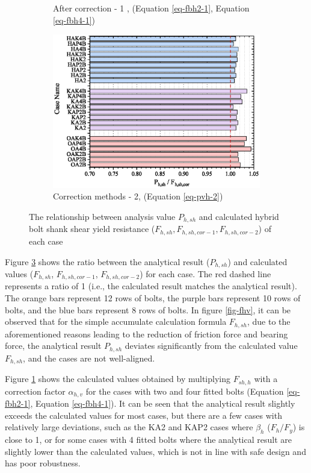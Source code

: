 \begin{figure}
\begin{subfigure}[b]{0.48\textwidth}
        \caption{After correction - 1 , (Equation \ref{eq-fbh2-1}, Equation \ref{eq-fbh4-1})}
        \label{fig-fhv-cor1}
    \end{subfigure}
    \centering
    \begin{subfigure}[b]{0.48\textwidth}
        \includegraphics[width=\linewidth]{imgs/ch7/RF-total-cor-2.eps}
        \caption{Correction methods - 2, (Equation \ref{eq-pvh-2})}
        \label{fig-fhv-cor2}
    \end{subfigure}
    \caption{The relationship between analysis value $P_{h,sh}$ and calculated hybrid bolt shank shear yield resistance ($F_{h,sh}, F_{h,sh,cor-1}, F_{h,sh,cor-2}$) of each case}
    \label{fig-fhv-total}
\end{figure}

Figure \ref{fig-fhv-total} shows the ratio between the analytical result ($P_{h,sh}$) and calculated values ($F_{h,sh}$, $F_{h,sh,cor-1}$, $F_{h,sh,cor-2}$) for each case. The red dashed line represents a ratio of 1 (i.e., the calculated result matches the analytical result). The orange bars represent 12 rows of bolts, the purple bars represent 10 rows of bolts, and the blue bars represent 8 rows of bolts. In figure \ref{fig-fhv}, it can be observed that for the simple accumulate calculation formula $F_{h,sh}$, due to the aforementioned reasons leading to the reduction of friction force and bearing force, the analytical result $P_{h,sh}$ deviates significantly from the calculated value $F_{h,sh}$, and the cases are not well-aligned. 

Figure \ref{fig-fhv-cor1} shows the calculated values obtained by multiplying $F_{sh,h}$ with a correction factor $\alpha_{h,v}$ for the cases with two and four fitted bolts (Equation \ref{eq-fbh2-1}, Equation \ref{eq-fbh4-1}). It can be seen that the analytical result slightly exceeds the calculated values for most cases, but there are a few cases with relatively large deviations, such as the KA2 and KAP2 cases where $\beta_h$ ($F_h/F_y$) is close to 1, or for some cases with 4 fitted bolts where the analytical result are slightly lower than the calculated values, which is not in line with safe design and has poor robustness.

